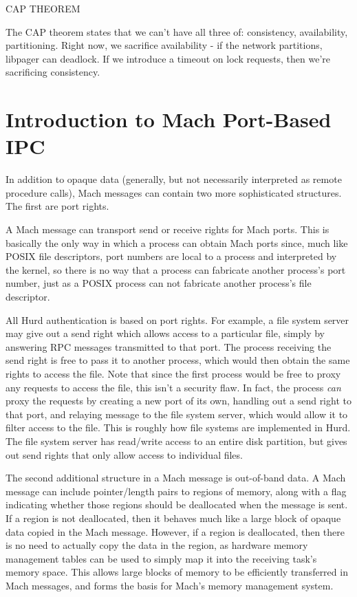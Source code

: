 \documentclass{article}
\begin{document}
CAP THEOREM

The CAP theorem states that we can't have all three of: consistency,
availability, partitioning.  Right now, we sacrifice availability - if
the network partitions, libpager can deadlock.  If we introduce a
timeout on lock requests, then we're sacrificing consistency.


\section{Introduction to Mach Port-Based IPC}

In addition to opaque data (generally, but not necessarily interpreted
as remote procedure calls), Mach messages can contain two more
sophisticated structures.  The first are port rights.

A Mach message can transport send or receive rights for Mach ports.
This is basically the only way in which a process can obtain Mach
ports since, much like POSIX file descriptors, port numbers are local
to a process and interpreted by the kernel, so there is no way that a
process can fabricate another process's port number, just as a POSIX
process can not fabricate another process's file descriptor.

All Hurd authentication is based on port rights.  For example, a file
system server may give out a send right which allows access to a
particular file, simply by answering RPC messages transmitted to that
port.  The process receiving the send right is free to pass it to
another process, which would then obtain the same rights to access the
file.  Note that since the first process would be free to proxy any
requests to access the file, this isn't a security flaw.  In fact, the
process {\it can} proxy the requests by creating a new port of its
own, handling out a send right to that port, and relaying message to
the file system server, which would allow it to filter access to the
file.  This is roughly how file systems are implemented in Hurd.  The
file system server has read/write access to an entire disk partition,
but gives out send rights that only allow access to individual files.

The second additional structure in a Mach message is out-of-band data.
A Mach message can include pointer/length pairs to regions of memory,
along with a flag indicating whether those regions should be
deallocated when the message is sent.  If a region is not deallocated,
then it behaves much like a large block of opaque data copied in the
Mach message.  However, if a region is deallocated, then there is no
need to actually copy the data in the region, as hardware memory
management tables can be used to simply map it into the receiving
task's memory space.  This allows large blocks of memory to be
efficiently transferred in Mach messages, and forms the basis for
Mach's memory management system.
\end{document}
